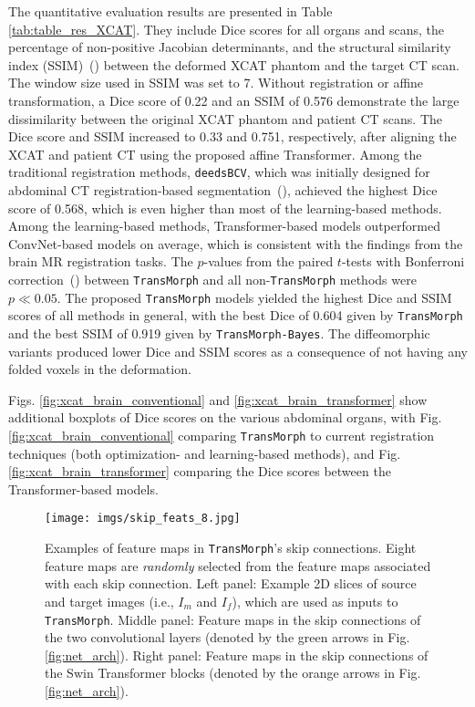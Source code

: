 \documentclass[times,twocolumn,final]{elsarticle}
\begin{document}
The quantitative evaluation results are presented in Table \ref{tab:table_res_XCAT}. They include Dice scores for all organs and scans, the percentage of non-positive Jacobian determinants, and the structural similarity index (SSIM)~(\cite{wang2004image}) between the deformed XCAT phantom and the target CT scan. The window size used in SSIM was set to 7. Without registration or affine transformation, a Dice score of 0.22 and an SSIM of 0.576 demonstrate the large dissimilarity between the original XCAT phantom and patient CT scans. The Dice score and SSIM increased to 0.33 and 0.751, respectively, after aligning the XCAT and patient CT using the proposed affine Transformer. Among the traditional registration methods, \texttt{deedsBCV}, which was initially designed for abdominal CT registration-based segmentation~(\cite{heinrich2015multi}), achieved the highest Dice score of 0.568, which is even higher than most of the learning-based methods. Among the learning-based methods, Transformer-based models outperformed ConvNet-based models on average, which is consistent with the findings from the brain MR registration tasks. The $p$-values from the paired $t$-tests with Bonferroni correction~(\cite{armstrong2014use}) between \texttt{TransMorph} and all non-\texttt{TransMorph} methods were $p\ll0.05$. The proposed \texttt{TransMorph} models yielded the highest Dice and SSIM scores of all methods in general, with the best Dice of 0.604 given by \texttt{TransMorph} and the best SSIM of 0.919 given by \texttt{TransMorph-Bayes}. The diffeomorphic variants produced lower Dice and SSIM scores as a consequence of not having any folded voxels in the deformation.

Figs. \ref{fig:xcat_brain_conventional} and \ref{fig:xcat_brain_transformer} show additional boxplots of Dice scores on the various abdominal organs, with Fig. \ref{fig:xcat_brain_conventional} comparing \texttt{TransMorph} to current registration techniques (both optimization- and learning-based methods), and Fig. \ref{fig:xcat_brain_transformer} comparing the Dice scores between the Transformer-based models.
\begin{figure*}[!t]
\centering
\texttt{[image: imgs/skip\_feats\_8.jpg]}
\caption{Examples of feature maps in \texttt{TransMorph}'s skip connections. Eight feature maps are \textit{randomly} selected from the feature maps associated with each skip connection. Left panel: Example 2D slices of source and target images (i.e., $I_m$ and $I_f$), which are used as inputs to \texttt{TransMorph}. Middle panel: Feature maps in the skip connections of the two convolutional layers (denoted by the green arrows in Fig. \ref{fig:net_arch}). Right panel: Feature maps in the skip connections of the Swin Transformer blocks (denoted by the orange arrows in Fig. \ref{fig:net_arch}). \label{fig:skip_feats_8}}
\end{figure*}
\end{document}
